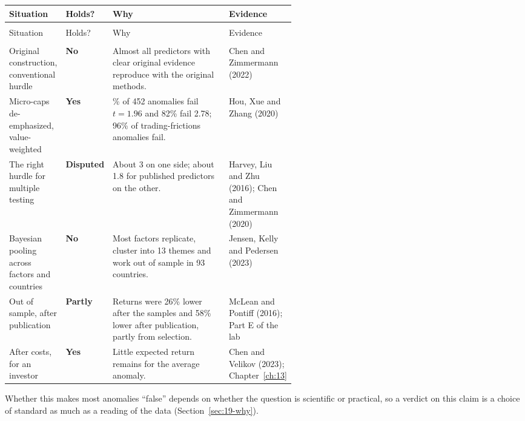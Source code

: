 {\small
\begin{longtable}{@{}>{\raggedright\arraybackslash}p{0.19\linewidth}>{\raggedright\arraybackslash}p{0.13\linewidth}>{\raggedright\arraybackslash}p{}>{\raggedright\arraybackslash}p{0.23\linewidth}@{}}
\toprule
Situation & Holds? & Why & Evidence \\
\midrule
\endfirsthead
\multicolumn{4}{@{}l}{\emph{(continued)}} \\
\toprule
Situation & Holds? & Why & Evidence \\
\midrule
\endhead
\midrule
\multicolumn{4}{r@{}}{\emph{(continued on the next page)}} \\
\endfoot
\bottomrule
\endlastfoot
Original construction, conventional hurdle & \textbf{No} & Almost all predictors with clear original evidence reproduce with the original methods. & Chen and Zimmermann (2022) \\*
\addlinespace[3pt]
Micro-caps de-emphasized, value-weighted & \textbf{Yes} & 65\% of 452 anomalies fail $t = 1.96$ and 82\% fail 2.78; 96\% of trading-frictions anomalies fail. & Hou, Xue and Zhang (2020) \\
\addlinespace[3pt]
The right hurdle for multiple testing & \textbf{Disputed} & About 3 on one side; about 1.8 for published predictors on the other. & Harvey, Liu and Zhu (2016); Chen and Zimmermann (2020) \\
\addlinespace[3pt]
Bayesian pooling across factors and countries & \textbf{No} & Most factors replicate, cluster into 13 themes and work out of sample in 93 countries. & Jensen, Kelly and Pedersen (2023) \\
\addlinespace[3pt]
Out of sample, after publication & \textbf{Partly} & Returns were 26\% lower after the samples and 58\% lower after publication, partly from selection. & McLean and Pontiff (2016); Part E of the lab \\*
\addlinespace[3pt]
After costs, for an investor & \textbf{Yes} & Little expected return remains for the average anomaly. & Chen and Velikov (2023); Chapter~\ref{ch:13} \\
\end{longtable}
\addtocounter{table}{-1}%
}

Whether this makes most anomalies ``false'' depends on whether the question is scientific or practical, so a verdict on this claim is a choice of standard as much as a reading of the data (Section~\ref{sec:19-why}).

